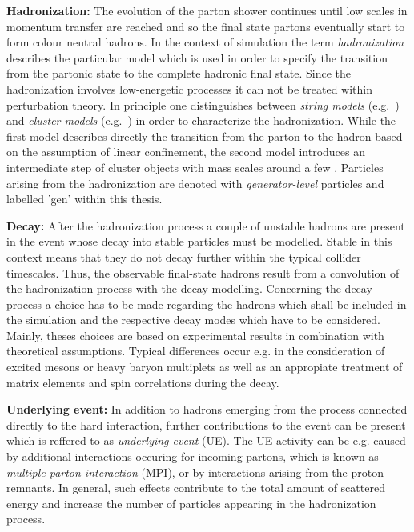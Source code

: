 \begin{description}
 \item \textbf{Hadronization:} The evolution of the parton shower continues until low scales in momentum transfer are reached and so the final state partons eventually start to form colour neutral hadrons. In the context of simulation the term \textit{hadronization} describes the particular model which is used in order to specify the transition from the partonic state to the complete hadronic final state. Since the hadronization involves low-energetic processes it can not be treated within perturbation theory. In principle one distinguishes between \textit{string models} (\cf e.g.~\cite{Andersson198331}) and \textit{cluster models} (\cf e.g.~\cite{Amati197987, Bassetto1979207}) in order to characterize the hadronization. While the first model describes directly the transition from the parton to the hadron based on the assumption of linear confinement, the second model introduces an intermediate step of cluster objects with mass scales around a few \gev. Particles arising from the hadronization are denoted with \textit{generator-level} particles and labelled 'gen' within this thesis.
 \item \textbf{Decay:} After the hadronization process a couple of unstable hadrons are present in the event whose decay into stable particles must be modelled. Stable in this context means that they do not decay further within the typical collider timescales. Thus, the observable final-state hadrons result from a convolution of the hadronization process with the decay modelling. Concerning the decay process a choice has to be made regarding the hadrons which shall be included in the simulation and the respective decay modes which have to be considered. Mainly, theses choices are based on experimental results in combination with theoretical assumptions. Typical differences occur e.g. in the consideration of excited mesons or heavy baryon multiplets as well as an appropiate treatment of matrix elements and spin correlations during the decay. 
 \item \textbf{Underlying event:} In addition to hadrons emerging from the process connected directly to the hard interaction, further contributions to the event can be present which is reffered to as \textit{underlying event} (UE). The UE activity can be e.g. caused by additional interactions occuring for incoming partons, which is known as \textit{multiple parton interaction} (MPI), or by interactions arising from the proton remnants. In general, such effects contribute to the total amount of scattered energy and increase the number of particles appearing in the hadronization process. 
\end{description}
